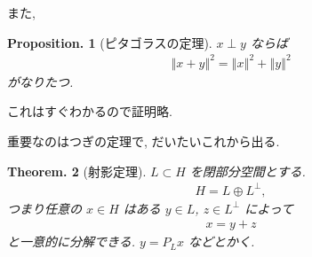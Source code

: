 \documentclass[openany, a4paper, oneside]{jsbook}
\theoremstyle{break}
\newtheorem{thm}{Theorem.}[section]
\newtheorem{prop}[thm]{Proposition.}
\theoremstyle{breakdefn}
\newcommand{\norm}[1]{\left\Vert#1\right\Vert}
\begin{document}
また,
\begin{prop}[ピタゴラスの定理]
$x \perp y$ ならば
\begin{align}
 \norm{x + y}^2
 =
 \norm{x}^2 + \norm{y}^2
\end{align}
がなりたつ.
\end{prop}
これはすぐわかるので証明略.

重要なのはつぎの定理で, だいたいこれから出る.
\begin{thm}[射影定理]
 $L \subset H$ を閉部分空間とする.
 \begin{align}
  H
  =
  L \oplus L^{\perp},
 \end{align}
 つまり任意の $x \in H$ はある $y \in L$, $z \in L^{\perp}$ によって
 \begin{align}
  x = y + z
 \end{align}
 と一意的に分解できる.
 $y = P_Lx$ などとかく.
\end{thm}
\end{document}
